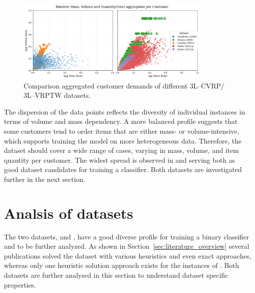 \begin{figure}[ht]
    \centering
    \includegraphics[width=0.85\textwidth]{pictures/comparison_datasets_3lcvrp.png}
    \caption{Comparison aggregated customer demands of different 3L--CVRP/ 3L--VRPTW datasets.}
    \label{fig:dataset_comparison}
\end{figure}

The dispersion of the data points reflects the diversity of individual instances in terms of volume
and mass dependency. A more balanced profile suggests that some customers tend to order items that
are either mass- or volume-intensive, which supports training the model on more heterogeneous data.
Therefore, the dataset should cover a wide range of cases, varying in mass, volume, and item
quantity per customer. The widest spread is observed in \krebsADataSetText and \gendreauDataSetText serving
both as good dataset candidates for training a classifier. Both datasets are investigated further in
the next section.

\section{Analsis of datasets}
\label{sec:analysis_datasets}

The two datasets, \krebsADataSetText and \gendreauDataSet, have a good diverse profile for training
a binary classifier and to be further analyzed.
As shown in Section~\ref{sec:literature_overview} several publications solved the \gendreauDataSetText dataset
with various heuristics and even exact approaches, whereas only one heuristic solution approach exists for the instances of \krebsADataSet.
Both datasets are further analysed in this section to understand dataset specific properties.

\subsubsection{\krebsADataSetText}

